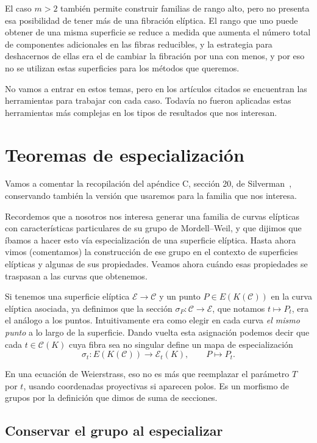 \documentclass[a4paper]{book}
\theoremstyle{definition}
\theoremstyle{plain}
\newcommand{\cc}{\mathcal{C}}
\newcommand{\ee}{\mathcal{E}}
\begin{document}
El caso $m>2$ también permite construir familias de rango alto, pero no presenta esa posibilidad de tener más de una fibración elíptica. El rango que uno puede obtener de una misma superficie se reduce a medida que aumenta el número total de componentes adicionales en las fibras reducibles, y la estrategia para deshacernos de ellas era el de cambiar la fibración por una con menos, y por eso no se utilizan estas superficies para los métodos que queremos. 

No vamos a entrar en estos temas, pero en los artículos citados se encuentran las herramientas para trabajar con cada caso. Todavía no fueron aplicadas estas herramientas más complejas en los tipos de resultados que nos interesan.


\section{Teoremas de especialización}\label{sec:especializacion}

Vamos a comentar la recopilación del apéndice C, sección 20, de Silverman~\cite{SilvermanAEC}, conservando también la versión que usaremos para la familia que nos interesa.

Recordemos que a nosotros nos interesa generar una familia de curvas elípticas con características particulares de su grupo de Mordell--Weil, y que dijimos que íbamos a hacer esto vía especialización de una superficie elíptica. Hasta ahora vimos (comentamos) la construcción de ese grupo en el contexto de superficies elípticas y algunas de sus propiedades. Veamos ahora cuándo esas propiedades se traspasan a las curvas que obtenemos.

Si tenemos una superficie elíptica $\ee\to\cc$ y un punto $P\in E(K(\cc))$ en la curva elíptica asociada, ya definimos que la sección $\sigma_P:\cc\to\ee$, que notamos $t\mapsto P_t$, era el análogo a los puntos. Intuitivamente era como elegir en cada curva \emph{el mismo punto} a lo largo de la superficie. Dando vuelta esta asignación podemos decir que cada $t\in\cc(K)$ cuya fibra sea no singular define un mapa de especialización
\[
\sigma_t:E(K(\cc))\longrightarrow\ee_t(K),\qquad P\longmapsto P_t.
\]

En una ecuación de Weierstrass, eso no es más que reemplazar el parámetro $T$ por $t$, usando coordenadas proyectivas si aparecen polos. Es un morfismo de grupos por la definición que dimos de suma de secciones.

\subsection*{Conservar el grupo al especializar}
\end{document}
